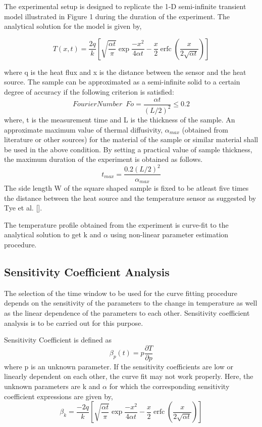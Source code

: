 \documentclass[12pt]{article}
\DeclareMathOperator{\erfc}{erfc}
\begin{document}
The experimental setup is designed to replicate the 1-D semi-infinite transient model illustrated in Figure 1 during the duration of the experiment. The analytical solution for the model is given by,

\begin{equation}
T(x,t) = \frac{2q}{k}\left[ \sqrt{\frac{\alpha t}{\pi}}\exp{\frac{-x^{2}}{4 \alpha t}} - \frac{x}{2}\erfc{(\frac{x}{2 \sqrt{\alpha t}})}\right]
\end{equation}

where q is the heat flux and x is the distance between the sensor and the heat source. The sample can be approximated as a semi-infinite solid to a certain degree of accuracy if the following criterion is satisfied:
\begin{equation}
Fourier Number  \phantom{1} Fo = \frac{\alpha t }{(L/2)^{2} } \leq 0.2
\end{equation}
where, t is the measurement time and L is the thickness of
the sample. An approximate maximum value of thermal diffusivity,
$\alpha_{max}$ (obtained from literature or other sources) for the
material of the sample or similar material shall be used in the above
condition. By setting a practical value of sample thickness, the maximum
duration of the experiment is obtained as follows.
\begin{equation}
t_{max} = \frac{0.2 (L/2)^{2}}{\alpha_{max}}
\end{equation}
The side length W of the square shaped sample is fixed to be atleast five times
 the distance between the heat source and the temperature sensor as suggested
by Tye et al. {[}{]}.

The temperature profile obtained from the experiment is curve-fit to the
analytical solution to get k and $\alpha$ using non-linear parameter
estimation procedure.


\subsection*{Sensitivity Coefficient Analysis}

The selection of the time window to be used for the curve fitting
procedure depends on the sensitivity of the parameters to the change in
temperature as well as the linear dependence of the parameters to each
other. Sensitivity coefficient analysis is to be carried out for this
purpose.

 Sensitivity Coefficient is defined as
\begin{equation}
\beta_{p}(t) = p \frac{\partial T}{\partial p}
\end{equation}
where p is an unknown parameter. If the sensitivity coefficients are low
or linearly dependent on each other, the curve fit may not work
properly. Here, the unknown parameters are k and $\alpha$ for which
the corresponding sensitivity coefficient expressions are given by,
\begin{equation}
\beta_{k} =\frac{-2q}{k} \left[ \sqrt{\frac{\alpha t}{\pi}}\exp{\frac{-x^{2}}{4 \alpha t}} - \frac{x}{2}\erfc{(\frac{x}{2 \sqrt{\alpha t}})}\right]
\end{equation}
\end{document}
